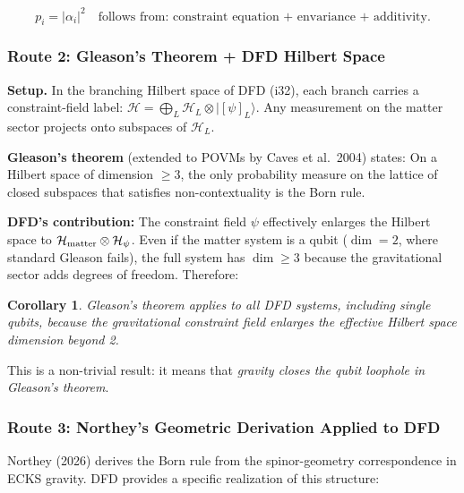 \documentclass[11pt,a4paper]{article}
\newtheorem{corollary}{Corollary}
\begin{document}
\begin{equation}
\boxed{p_i = |\alpha_i|^2 \quad \text{follows from: constraint equation + envariance + additivity.}}
\end{equation}

\subsubsection{Route 2: Gleason's Theorem + DFD Hilbert Space}

\textbf{Setup.} In the branching Hilbert space of DFD (i32), each branch carries a constraint-field label: $\mathcal{H} = \bigoplus_L \mathcal{H}_L \otimes |[\psi]_L\rangle$. Any measurement on the matter sector projects onto subspaces of $\mathcal{H}_L$.

\textbf{Gleason's theorem} (extended to POVMs by Caves et al.\ 2004) states: On a Hilbert space of dimension $\geq 3$, the only probability measure on the lattice of closed subspaces that satisfies non-contextuality is the Born rule.

\textbf{DFD's contribution:} The constraint field $\psi$ effectively enlarges the Hilbert space to $\mathcal{H}_{\rm matter} \otimes \mathcal{H}_\psi$. Even if the matter system is a qubit ($\dim = 2$, where standard Gleason fails), the full system has $\dim \geq 3$ because the gravitational sector adds degrees of freedom. Therefore:

\begin{corollary}
Gleason's theorem applies to all DFD systems, including single qubits, because the gravitational constraint field enlarges the effective Hilbert space dimension beyond 2.
\end{corollary}

This is a non-trivial result: it means that \emph{gravity closes the qubit loophole in Gleason's theorem}.

\subsubsection{Route 3: Northey's Geometric Derivation Applied to DFD}

Northey (2026) derives the Born rule from the spinor-geometry correspondence in ECKS gravity. DFD provides a specific realization of this structure:
\end{document}
